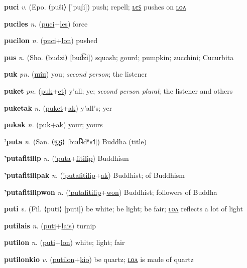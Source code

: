 \textbf{\hypertarget{puci}{puci}} \textit{v.} (Epo. ⟨puŝi⟩ [ˈpuʃi])
push; repell; \hyperlink{puciles}{ʟєꜱ} pushes on \hyperlink{pucilon}{ʟᴏᴧ}

\textbf{\hypertarget{puciles}{puciles}} \textit{n.} (\hyperlink{puci}{puci}+\allowbreak \hyperlink{les}{les})
force

\textbf{\hypertarget{pucilon}{pucilon}} \textit{n.} (\hyperlink{puci}{puci}+\allowbreak \hyperlink{lon}{lon})
pushed

\textbf{\hypertarget{pus}{pus}} \textit{n.} (Sho. ⟨budzi⟩ [bud͡zi])
squash; gourd; pumpkin; zucchini; Cucurbita

\textbf{\hypertarget{puk}{puk}} \textit{pn.} (\hyperlink{min}{\sout{min}})
you; \textit{second person}; the listener

\textbf{\hypertarget{puket}{puket}} \textit{pn.} (\hyperlink{puk}{puk}+\allowbreak \hyperlink{et}{et})
y’all; ye; \textit{second person plural}; the listener and others

\textbf{\hypertarget{puketak}{puketak}} \textit{n.} (\hyperlink{puket}{puket}+\allowbreak \hyperlink{ak}{ak})
y’all’s; yer

\textbf{\hypertarget{pukak}{pukak}} \textit{n.} (\hyperlink{puk}{puk}+\allowbreak \hyperlink{ak}{ak})
your; yours

\textbf{\hypertarget{'puta}{'puta}} \textit{n.} (San. ⟨{\devanagari{}बुद्ध}⟩ [bud̚˨dʱɐ˦])
Buddha (title)

\textbf{\hypertarget{'putafitilip}{'putafitilip}} \textit{n.} (\hyperlink{'puta}{'puta}+\allowbreak \hyperlink{fitilip}{fitilip})
Buddhism

\textbf{\hypertarget{'putafitilipak}{'putafitilipak}} \textit{n.} (\hyperlink{'putafitilip}{'putafitilip}+\allowbreak \hyperlink{ak}{ak})
Buddhist; of Buddhism

\textbf{\hypertarget{'putafitilipwon}{'putafitilipwon}} \textit{n.} (\hyperlink{'putafitilip}{'putafitilip}+\allowbreak \hyperlink{won}{won})
Buddhist; followers of Buddha

\textbf{\hypertarget{puti}{puti}} \textit{v.} (Fil. ⟨puti⟩ [puti])
be white; be light; be fair; \hyperlink{putilon}{ʟᴏᴧ} reflects a lot of light

\textbf{\hypertarget{putilais}{putilais}} \textit{n.} (\hyperlink{puti}{puti}+\allowbreak \hyperlink{lais}{lais})
turnip

\textbf{\hypertarget{putilon}{putilon}} \textit{n.} (\hyperlink{puti}{puti}+\allowbreak \hyperlink{lon}{lon})
white; light; fair

\textbf{\hypertarget{putilonkio}{putilonkio}} \textit{v.} (\hyperlink{putilon}{putilon}+\allowbreak \hyperlink{kio}{kio})
be quartz; \hyperlink{putilonkiolon}{ʟᴏᴧ} is made of quartz

